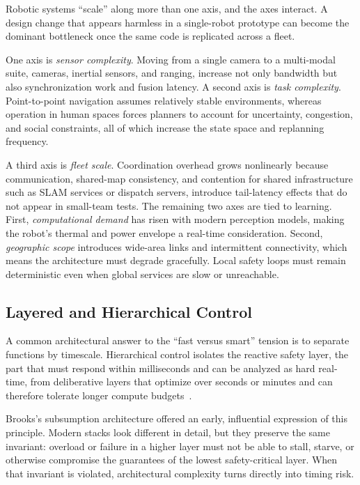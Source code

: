 \documentclass[smallextended]{svjour3}
\begin{document}
Robotic systems ``scale'' along more than one axis, and the axes interact. A design change that appears harmless in a single-robot prototype can become the dominant bottleneck once the same code is replicated across a fleet.

One axis is \emph{sensor complexity}.  Moving from a single camera to a multi-modal suite, cameras, inertial sensors, and ranging, increase not only bandwidth but also synchronization work and fusion latency. A second axis is \emph{task complexity}. Point-to-point navigation assumes relatively stable environments, whereas operation in human spaces forces planners to account for uncertainty, congestion, and social constraints, all of which increase the state space and replanning frequency.

A third axis is \emph{fleet scale}.  Coordination overhead grows nonlinearly because communication, shared-map consistency, and contention for shared infrastructure such as SLAM services or dispatch servers, introduce tail-latency effects that do not appear in small-team tests. The remaining two axes are tied to learning. First, \emph{computational demand} has risen with modern perception models, making the robot's thermal and power envelope a real-time consideration. Second, \emph{geographic scope} introduces wide-area links and intermittent connectivity, which means the architecture must degrade gracefully. Local safety loops must remain deterministic even when global services are slow or unreachable.

\subsection{Layered and Hierarchical Control}

A common architectural answer to the ``fast versus smart'' tension is to separate functions by timescale. Hierarchical control isolates the reactive safety layer, the part that must respond within milliseconds and can be analyzed as hard real-time, from deliberative layers that optimize over seconds or minutes and can therefore tolerate longer compute budgets~\cite{brooks1986}.

Brooks's subsumption architecture offered an early, influential expression of this principle. Modern stacks look different in detail, but they preserve the same invariant: overload or failure in a higher layer must not be able to stall, starve, or otherwise compromise the guarantees of the lowest safety-critical layer. When that invariant is violated, architectural complexity turns directly into timing risk.
\end{document}
